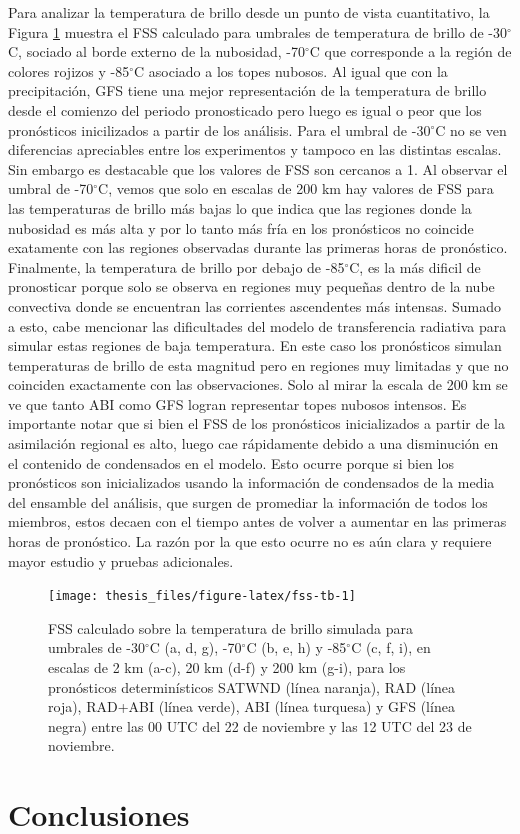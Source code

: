 \documentclass[12pt,oneside,a4paper]{reedthesis}
\begin{document}
Para analizar la temperatura de brillo desde un punto de vista cuantitativo, la Figura \ref{fig:fss-tb} muestra el FSS calculado para umbrales de temperatura de brillo de -30\(^\circ\)C, sociado al borde externo de la nubosidad, -70\(^\circ\)C que corresponde a la región de colores rojizos y -85\(^\circ\)C asociado a los topes nubosos. Al igual que con la precipitación, GFS tiene una mejor representación de la temperatura de brillo desde el comienzo del periodo pronosticado pero luego es igual o peor que los pronósticos inicilizados a partir de los análisis. Para el umbral de -30\(^\circ\)C no se ven diferencias apreciables entre los experimentos y tampoco en las distintas escalas. Sin embargo es destacable que los valores de FSS son cercanos a 1. Al observar el umbral de -70\(^\circ\)C, vemos que solo en escalas de 200 km hay valores de FSS para las temperaturas de brillo más bajas lo que indica que las regiones donde la nubosidad es más alta y por lo tanto más fría en los pronósticos no coincide exatamente con las regiones observadas durante las primeras horas de pronóstico. Finalmente, la temperatura de brillo por debajo de -85\(^\circ\)C, es la más dificil de pronosticar porque solo se observa en regiones muy pequeñas dentro de la nube convectiva donde se encuentran las corrientes ascendentes más intensas. Sumado a esto, cabe mencionar las dificultades del modelo de transferencia radiativa para simular estas regiones de baja temperatura. En este caso los pronósticos simulan temperaturas de brillo de esta magnitud pero en regiones muy limitadas y que no coinciden exactamente con las observaciones. Solo al mirar la escala de 200 km se ve que tanto ABI como GFS logran representar topes nubosos intensos. Es importante notar que si bien el FSS de los pronósticos inicializados a partir de la asimilación regional es alto, luego cae rápidamente debido a una disminución en el contenido de condensados en el modelo. Esto ocurre porque si bien los pronósticos son inicializados usando la información de condensados de la media del ensamble del análisis, que surgen de promediar la información de todos los miembros, estos decaen con el tiempo antes de volver a aumentar en las primeras horas de pronóstico. La razón por la que esto ocurre no es aún clara y requiere mayor estudio y pruebas adicionales.


\begin{figure}
\texttt{[image: thesis\_files/figure-latex/fss-tb-1]} \caption{FSS calculado sobre la temperatura de brillo simulada para umbrales de -30\(^\circ\)C (a, d, g), -70\(^\circ\)C (b, e, h) y -85\(^\circ\)C (c, f, i), en escalas de 2 km (a-c), 20 km (d-f) y 200 km (g-i), para los pronósticos determinísticos SATWND (línea naranja), RAD (línea roja), RAD+ABI (línea verde), ABI (línea turquesa) y GFS (línea negra) entre las 00 UTC del 22 de noviembre y las 12 UTC del 23 de noviembre.}\label{fig:fss-tb}
\end{figure}
\hypertarget{conclusiones-2}{%
\section{Conclusiones}\label{conclusiones-2}}
\end{document}
